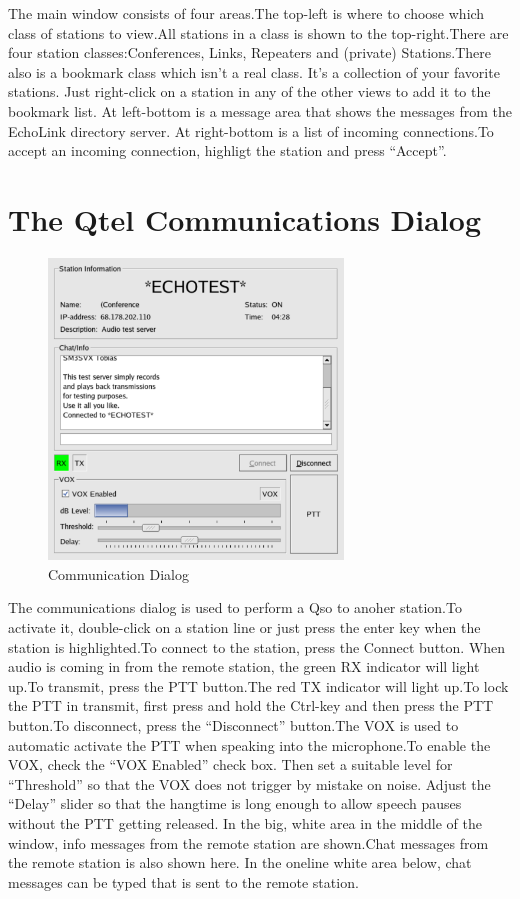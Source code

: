 \documentclass[paper=a4,fontsize=12pt]{scrartcl}
\begin{document}
   The main window consists of four areas.{\kern2pt}The top-left is where to choose which class of stations to view.{\kern2.5pt}All stations
   in a class is shown to the top-right.{\kern3pt}There are four station classes:{\kern2.5pt}Conferences, Links, Repeaters and (private)
   Stations.{\kern2.5pt}There also is a bookmark class which isn't a real class. It's a collection of your favorite stations. Just 
   right-click on a station in any of the other views to add it to the bookmark list. At left-bottom is a message area that shows the
   messages from the EchoLink directory server. At right-bottom is a list of incoming connections.{\kern2pt}To accept an incoming 
   connection, highligt the station and press ``Accept''.

\section{The Qtel Communications Dialog}
   \begin{figure}[H]
      \centering
      \includegraphics[height=80mm]{qtel-comdialog.pdf}
      \caption[The Qtel Communications Dialog]{Communication Dialog}
   \end{figure}

   The communications dialog is used to perform a Qso to anoher station.{\kern2.5pt}To activate it, double-click on a station line or just 
   press the enter key when the station is highlighted.{\kern2.5pt}To connect to the station, press the Connect button. When audio is coming 
   in from the remote station, the green RX indicator will light up.{\kern2.5pt}To transmit, press the PTT button.{\kern3pt}The red TX 
   indicator will light up.{\kern2.5pt}To lock the PTT in transmit, first press and hold the Ctrl-key and then press the PTT
   button.{\kern2.5pt}To disconnect, press the ``Disconnect'' button.{\kern3pt}The VOX is used to automatic activate the PTT when speaking
   into the microphone.{\kern2.5pt}To enable the VOX, check the ``VOX Enabled'' check box. Then set a suitable level for ``Threshold'' so 
   that the VOX does not trigger by mistake on noise. Adjust the ``Delay'' slider so that the hangtime is long enough to allow speech pauses 
   without the PTT getting released. In the big, white area in the middle of the window, info messages from the remote station are 
   shown.{\kern3pt}Chat messages from the remote station is also shown here. In the oneline white area below, chat messages can be typed 
   that is sent to the remote station.
\end{document}
